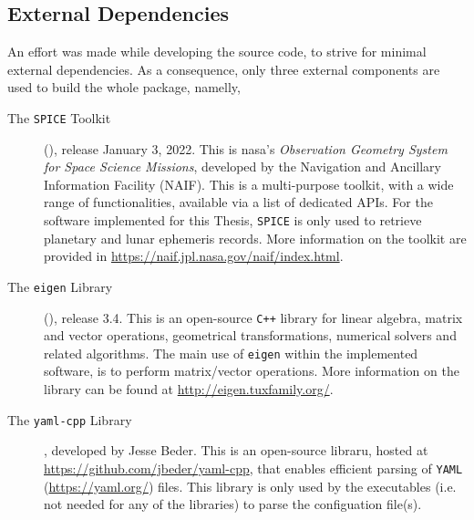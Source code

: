\subsection{External Dependencies}\label{sec:the-software-dependencies}
An effort was made while developing the source code, to strive for minimal external 
dependencies. As a consequence, only three external components are used to build 
the whole package, namelly,
\begin{description}
  \item[The \texttt{SPICE} Toolkit] (\cite{Acton2018}), release January 3, 2022. 
  This is \gls{nasa}'s 
  \emph{Observation Geometry System for Space Science Missions}, developed by the 
  Navigation and Ancillary Information Facility (NAIF). This is a multi-purpose 
  toolkit, with a wide range of functionalities, available via a list of dedicated 
  APIs. For the software implemented for this Thesis, \texttt{SPICE} is only used to 
  retrieve planetary and lunar ephemeris records. More information on the 
  toolkit are provided in \url{https://naif.jpl.nasa.gov/naif/index.html}.

  \item[The \texttt{eigen} Library] (\cite{eigenweb}), release 3.4. This is an 
  open-source \texttt{C++} library for linear algebra, matrix and vector 
  operations, geometrical transformations, numerical solvers and related algorithms.
  The main use of \texttt{eigen} within the implemented software, is to perform 
  matrix/vector operations. More information on the library can be found at 
  \url{http://eigen.tuxfamily.org/}.

  \item[The \texttt{yaml-cpp} Library], developed by Jesse Beder. This is an open-source 
  libraru, hosted at \url{https://github.com/jbeder/yaml-cpp}, that enables efficient 
  parsing of \texttt{YAML} (\url{https://yaml.org/}) files. This library is only 
  used by the executables (i.e. not needed for any of the libraries) to parse the 
  configuation file(s).
\end{description}
